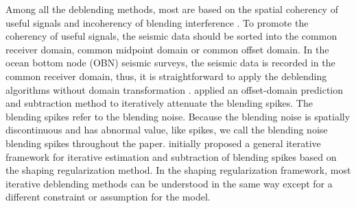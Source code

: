 Among all the deblending methods, most are based on the spatial coherency of useful signals and incoherency of blending interference \cite[]{wujuan2019jse1}. To promote the coherency of useful signals, the seismic data should be sorted into the common receiver domain, common midpoint domain or common offset domain. In the ocean bottom node (OBN) seismic surveys, the seismic data is recorded in the common receiver domain, thus, it is straightforward to apply the deblending algorithms without domain transformation \cite[]{arazthesis2012}. \cite{kim2009} applied an offset-domain prediction and subtraction method to iteratively attenuate the blending spikes. The blending spikes refer to the blending noise. Because the blending noise is spatially discontinuous and has abnormal value, like spikes, we call the blending noise blending spikes throughout the paper. \cite{yangkang20142} initially proposed a general iterative framework for iterative estimation and subtraction of blending spikes based on the shaping regularization method. In the shaping regularization framework, most iterative deblending methods can be understood in the same way except for a different constraint or assumption for the model.

